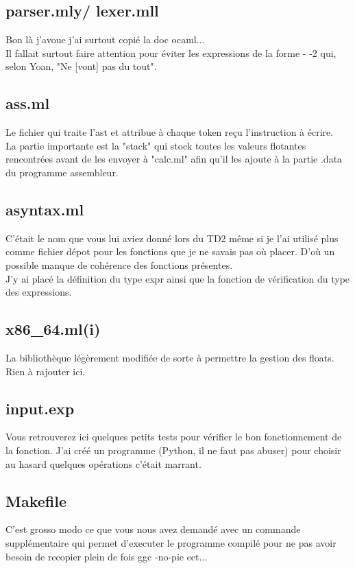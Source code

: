 \documentclass{article}
\begin{document}
\subsection{parser.mly/ lexer.mll}
Bon là j'avoue j'ai surtout copié la doc ocaml...\\
Il fallait surtout faire attention pour éviter les expressions de la forme - -2 qui, selon Yoan, "Ne [vont] pas du tout".

\subsection{ass.ml}
Le fichier qui traite l'ast et attribue à chaque token reçu l'instruction à écrire.\\
La partie importante est la "stack" qui stock toutes les valeurs flotantes rencontrées avant de les envoyer à "calc.ml" afin qu'il les ajoute à la partie .data du programme assembleur.

\subsection{asyntax.ml}
C'était le nom que vous lui aviez donné lors du TD2 même si je l'ai utilisé plus comme fichier dépot pour les fonctions que je ne savais pas où placer. D'où un possible manque de cohérence des fonctions présentes.\\
J'y ai placé la définition du type expr ainsi que la fonction de vérification du type des expressions.


\subsection{x86\_64.ml(i)}
La bibliothèque légèrement modifiée de sorte à permettre la gestion des floats. Rien à rajouter ici.

\subsection{input.exp}
Vous retrouverez ici quelques petits tests pour vérifier le bon fonctionnement de la fonction.
J'ai créé un programme (Python, il ne faut pas abuser) pour choisir au hasard quelques opérations c'était marrant.\\

\subsection{Makefile}
C'est grosso modo ce que vous nous avez demandé avec un commande supplémentaire qui permet d'executer le programme compilé pour ne pas avoir besoin de recopier plein de fois ggc -no-pie ect...\\
\end{document}
